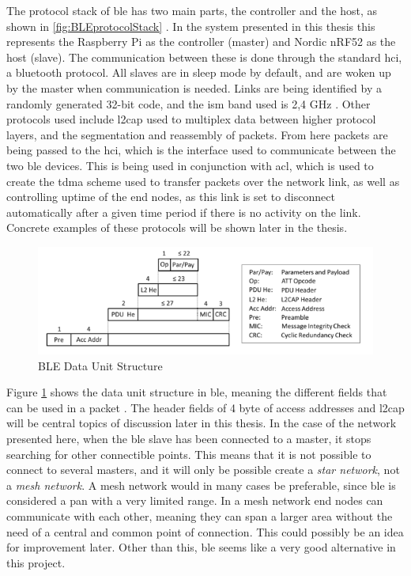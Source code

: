 \noindent The protocol stack of \gls{ble} has two main parts, the controller and the host, as shown in \ref{fig:BLEprotocolStack} \cite{gomez2012overview}. In the system presented in this thesis this represents the Raspberry Pi as the controller (master) and Nordic nRF52 as the host (slave). The communication between these is done through the standard \gls{hci}, a bluetooth protocol. All slaves are in sleep mode by default, and are woken up by the master when communication is needed. Links are being identified by a randomly generated 32-bit code, and the \gls{ism} band used is 2,4 GHz \cite{gomez2012overview}. Other protocols used include \gls{l2cap} used to multiplex data between higher protocol layers, and the segmentation and reassembly of packets. From here packets are being passed to the \gls{hci}, which is the interface used to communicate between the two \gls{ble} devices. This is being used in conjunction with \gls{acl}, which is used to create the \gls{tdma} scheme used to transfer packets over the network link, as well as controlling uptime of the end nodes, as this link is set to disconnect automatically after a given time period if there is no activity on the link. Concrete examples of these protocols will be shown later in the thesis. 



\begin{figure}[ht]
    \centering
    \includegraphics[scale=0.7]{BLEdataUnitStructure.png}    
    \caption{BLE Data Unit Structure}
    \label{fig:BLEdataUnitStructure}
\end{figure}

\noindent Figure \ref{fig:BLEdataUnitStructure} shows the data unit structure in \gls{ble}, meaning the different fields that can be used in a packet \cite{gomez2012overview}. The header fields of 4 \gls{byte} of access addresses and \gls{l2cap} will be central topics of discussion later in this thesis. In the case of the network presented here, when the \gls{ble} slave has been connected to a master, it stops searching for other connectible points. This means that it is not possible to connect to several masters, and it will only be possible create a \textit{star network}, not a \textit{mesh network}. A mesh network would in many cases be preferable, since \gls{ble} is considered a \gls{pan} with a very limited range. In a mesh network end nodes can communicate with each other, meaning they can span a larger area without the need of a central and common point of connection. This could possibly be an idea for improvement later. Other than this, \gls{ble} seems like a very good alternative in this project. 

